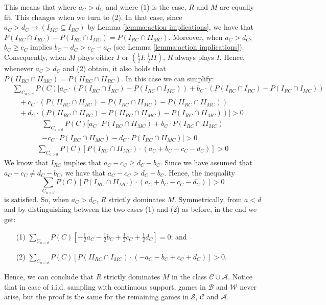 \documentclass[fleqn,reqno,12pt]{article}
\theoremstyle{Satz}
\theoremstyle{Bsp}
\begin{document}
\noindent This means that where $a_{C}>d_{C}$ and
where (1) is the case, $R$ and $M$ are equally fit. This changes when we turn to (2). In that
case, since $a_{C}>d_{C}\rightarrow(I_{MC}\subseteq I_{RC})$ by Lemma \ref{lemma:action implications}, we have that
$P(I_{RC} \cap I_{RC})-P(I_{RC}\cap I_{MC})=P(I_{RC}\cap II_{MC})$. Moreover, when $a_{C}>d_{C}$, $b_{C}\geq c_{C}$ implies
  $b_{C}-d_{C}>c_{C}-a_{C}$ (see Lemma \ref{lemma:action implications}). Consequently, when $M$ plays either $I$ or $  (\frac{1}{2}I;\frac{1}{2}II)$, $R$ always plays $I$. Hence, whenever $a_{C}>d_{C}$ and (2) obtain, it also holds that $P(II_{RC}\cap II_{MC})=P(II_{RC} \cap II_{RC})$. In this case we can simplify:
\begin{align*}
& \textstyle{\sum_{C_{a>d}}} P(C)[a_{C} \cdot (P(I_{RC}\cap I_{RC}) - P(I_{RC}\cap I_{MC})) + b_{C} \cdot  (P(I_{RC}\cap I_{RC})- P(I_{RC}\cap I_{MC})) \\
& \ \ \ \ + c_{C} \cdot (P(II_{RC}\cap II_{RC})- P(I_{RC}\cap II_{MC})- P(II_{RC}\cap II_{MC})) \\
& \ \ \ \ + d_{C} \cdot (P(II_{RC}\cap II_{RC})- P(II_{RC}\cap II_{MC})- P(I_{RC}\cap II_{MC}))]> 0
\end{align*}
\begin{align*}
\textstyle{\sum_{C_{a>d}}} P(C)[a_{C} \cdot P(I_{RC}\cap II_{MC}) + b_{C} \cdot  P(I_{RC}\cap II_{MC}) \\- c_{C} \cdot P(I_{RC}\cap II_{MC}) - d_{C} \cdot P(I_{RC}\cap II_{MC})]> 0
\end{align*}
\begin{align*}
\textstyle{\sum_{C_{a>d}}} P(C)[P(I_{RC}\cap II_{MC})\cdot (a_{C} + b_{C} - c_{C} - d_{C})]> 0
\end{align*}
\noindent We know that $I_{RC}$ implies that $a_{C}-c_{C}\geq d_{C}-b_{C}$.
Since we have assumed that $a_{C}-c_{C}\neq d_{C}-b_{C}$, we have that
$a_{C}-c_{C} > d_{C}-b_{C}$. Hence, the inequality
$$\sum_{C_{a>d}} P(C)[P(I_{RC}\cap II_{MC})\cdot (a_{C} + b_{C} - c_{C} - d_{C})]> 0$$
is satisfied. So, when $a_{C}>d_{C}$, $R$
strictly dominates $M$. Symmetrically, from $a<d$ and by distinguishing between the two cases
(1) and (2) as before, in the end we get:
\begin{itemize}
\item[(1)] $\sum_{C_{a<d}} P(C)[-\frac{1}{2}a_{C}- \frac{1}{2}b_{C} + \frac{1}{2}c_{C} + \frac{1}{2}d_{C}]= 0$; and
\item[(2)] $\sum_{C_{a<d}} P(C)[P(II_{RC}\cap I_{MC})\cdot (-a_{C} - b_{C} + c_{C} + d_{C})]> 0$.
\end{itemize}
\noindent Hence, we can conclude that $R$ strictly dominates $M$ in the class
$\mathcal{C}\cup\mathcal{A}$. Notice that in case of i.i.d. sampling with continuous support,
games in $\mathcal{B} $ and $\mathcal{W} $ never arise, but the proof is the same for the
remaining games in $\mathcal{S}$, $\mathcal{C} $ and $\mathcal{A}$.
\end{document}
